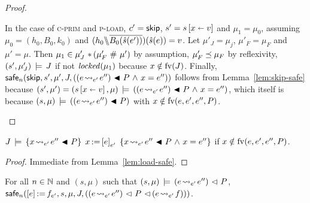 \documentclass[11pt]{report}         %
\begin{document}
\begin{proof}
\begin{enumerate}
            In the case of \textsc{c-prim} and \textsc{p-load}, $c' = \operatorname{\mathsf{skip}}$, $s' = s \left[ x \shortleftarrow v \right]$ and $\mu_1 = \mu_0$, assuming $\mu_0 = (h_0,B_0,k_0)$ and $(h_0 \backslash\!\!\backslash \overline{B_0(\hat{s}(e'))})(\hat{s}(e)) = v$. Let $\mu'_J = \mu_j$, $\mu'_F = \mu_F$ and $\mu' = \mu$. Then $\mu_1 \in \mu'_J \operatorname{\,\ast\,} (\mu'_F \operatorname{\,\#\,} \mu')$ by assumption, $\mu'_F \preceq \mu_F$ by reflexivity, $(s',\mu'_J) \,\models\, J$ if not $\mathit{locked}(\mu_1)$ because $x \notin \mathrm{fv}(J)$. Finally, $\mathsf{safe}_{n}(\operatorname{\mathsf{skip}},s',\mu',J,((e \!\leadsto_{e'}\! e'') \operatorname{\,\blacktriangleleft\,} P \operatorname{\,\wedge\,} x = e''))$ follows from Lemma~\ref{lem:skip-safe} because $(s',\mu') = (s \left[ x \shortleftarrow v \right],\mu) \,\models\, ((e \!\leadsto_{e'}\! e'') \operatorname{\,\blacktriangleleft\,} P \operatorname{\,\wedge\,} x = e'')$, which itself is because $(s,\mu) \,\models\, ((e \!\leadsto_{e'}\! e'') \operatorname{\,\blacktriangleleft\,} P)$ with $x \notin \mathrm{fv}(e,e',e'',P)$. 
      \end{enumerate}
\end{proof}

\begin{lemma}
    \label{lem:load-sound}
    $J\,\models\,\left\lbrace x \!\leadsto_{e'}\! e'' \operatorname{\,\blacktriangleleft\,} P \right\rbrace\;x \operatorname{:\!=} \left[ e \right]_{e'}\;\left\lbrace x \!\leadsto_{e'}\! e'' \operatorname{\,\blacktriangleleft\,} P \operatorname{\,\wedge\,} x = e'' \right\rbrace$ if $x \notin \mathrm{fv}(e,e',e'',P)$. 
\end{lemma} 

\begin{proof}
    Immediate from Lemma~\ref{lem:load-safe}. 
\end{proof}

\begin{lemma}
    \label{lem:store-safe}
    For all $n \in \mathbb{N}$ and $(s,\mu)$ such that $(s,\mu) \,\models\, (e \!\leadsto_{e'}\! e'') \operatorname{\,\vartriangleleft\,} P$, $\mathsf{safe}_{n}(\left[ e \right] \operatorname{:\!=} f_{e'},s,\mu,J,\left((e \!\leadsto_{e'}\! e'') \operatorname{\,\vartriangleleft\,} P \operatorname{\,\vartriangleleft\,} (e \!\leadsto_{e'}\! f)\right))$. 
\end{lemma}
\end{document}
